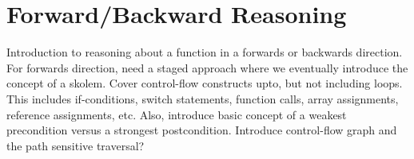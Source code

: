 \section{Forward/Backward Reasoning}

Introduction to reasoning about a function in a forwards or backwards direction.  For forwards direction, need a staged approach where we eventually introduce the concept of a skolem.  Cover control-flow constructs upto, but not including loops.  This includes if-conditions, switch statements, function calls, array assignments, reference assignments, etc.  Also, introduce basic concept of a weakest precondition versus a strongest postcondition.  Introduce control-flow graph and the path sensitive traversal?